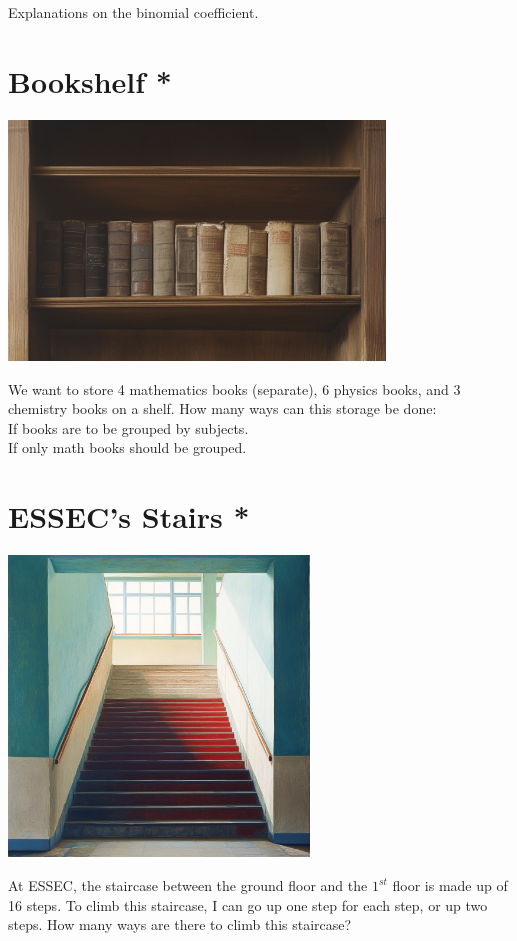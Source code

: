 \documentclass[]{article}
\begin{document}
	Explanations on the binomial coefficient.
	
	\newpage
	\section{Bookshelf *}
	\begin{center}
		\includegraphics[width=10cm]{bookshelf.png}
	\end{center}
	We want to store 4 mathematics books (separate), 6 physics books, and 3 chemistry books on a shelf.
	How many ways can this storage be done:\\
	If books are to be grouped by subjects.\\
	If only math books should be grouped.
	
	\newpage
	\section{ESSEC's Stairs *}
	\begin{center}
		\includegraphics[height=8cm]{stairs.png}
	\end{center}
	At ESSEC, the staircase between the ground floor and the $1^{st}$ floor is made up of 16 steps.
	To climb this staircase, I can go up one step for each step, or up two steps. How many ways are there to climb this staircase?
	
	
	
	
\end{document}
